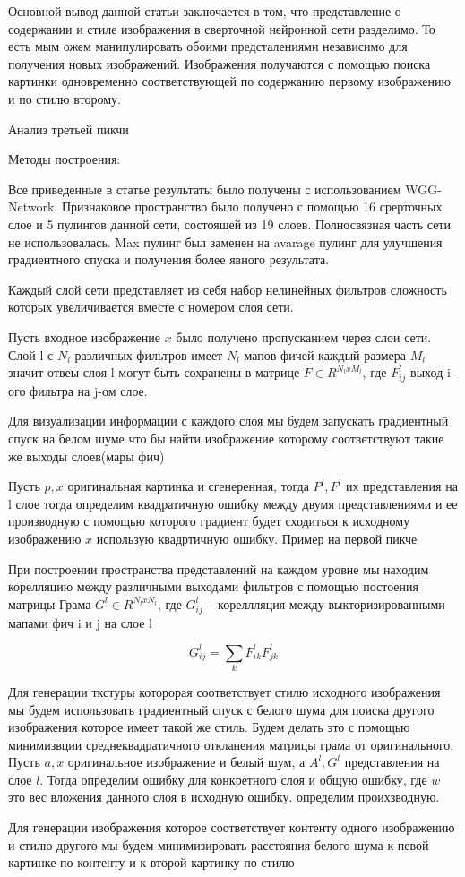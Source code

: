 \documentclass{article}
\begin{document}
Основной вывод данной статьи заключается в том, что представление о содержании и стиле изображения в сверточной нейронной сети разделимо. То есть мым ожем манипулировать обоими предсталениями независимо для получения новых изображений. Изображения получаются с помощью поиска картинки одновременно соответствующей по содержанию первому изображению и по стилю второму.


Анализ третьей пикчи


Методы построения:


Все приведенные в статье результаты было получены с использованием WGG-Network. Признаковое пространство было получено с помощью 16 срерточных слое и 5 пулингов данной сети, состоящей из 19 слоев. Полносвязная часть сети не использовалась. Max пулинг был заменен на avarage пулинг для улучшения градиентного спуска и получения более явного результата.


Каждый слой сети представляет из себя набор нелинейных фильтров сложность которых увеличивается вместе с номером слоя сети.



Пусть  входное изображение $x$ было получено пропусканием через слои сети. Слой l с $N_l$ различных фильтров имеет  $N_l$  мапов фичей каждый размера  $M_l$ значит отвеы слоя l могут быть сохранены в матрице $ F \in R^{N_l x M_l} $, где $F_{ij}^{l}$  выход i-ого фильтра на j-ом слое.


Для визуализации информации с каждого слоя мы будем запускать градиентный спуск на белом шуме что бы найти изображение которому соответствуют такие же выходы слоев(мары фич)


Пусть $p, x$ оригинальная картинка и сгенеренная, тогда $P^l, F^l$ их представления на l слое тогда определим квадратичную ошибку между двумя представлениями и ее производную с помощью которого градиент будет сходиться к исходному изображению $x$ использую квадртичную ошибку. Пример на первой пикче


При построении пространства представлений на каждом уровне мы находим корелляцию между различными выходами фильтров с помощью постоения матрицы Грама $G^l \in R^{N_l x N_l}$, где $G_{ij}^{l}$ -- кореллляция между выкторизированными мапами фич i и j на слое l

$$
G_{ij}^l = \sum_k F_{ik}^l F_{jk}^l
$$

Для генерации ткстуры которорая соответствует стилю исходного изображения мы будем использовать градиентный спуск с белого шума для поиска другого изображения которое имеет такой же стиль. Будем делать это с помощью минимизвции среднеквадратичного откланения матрицы грама от оригинального. Пусть $a, x$  оригинальное изображение и белый шум, а $A^l, G^l$ представления на слое $l$. Тогда определим ошибку для конкретного слоя и общую ошибку, где $w$ это вес вложения данного слоя в исходную ошибку. определим проихзводную.


Для генерации изображения которое соответствует контенту одного изображению и стилю другого мы будем минимизировать расстояния белого шума к певой картинке по контенту и к второй картинку по стилю
\end{document}
